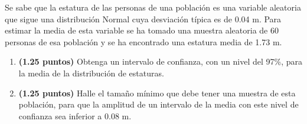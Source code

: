 
Se sabe que la estatura de las personas de una población es una variable aleatoria que sigue una distribución Normal cuya desviación típica es de 0.04 m. Para estimar la media de esta variable se ha tomado una muestra aleatoria de 60 personas de esa población y se ha encontrado una estatura media de 1.73 m.
\begin{enumerate}[label=\alph*)]
\item \textbf{(1.25 puntos)} Obtenga un intervalo de confianza, con un nivel del 97\%, para la media de la distribución de estaturas.
\item \textbf{(1.25 puntos)} Halle el tamaño mínimo que debe tener una muestra de esta población, para que la amplitud de un intervalo de la media con este nivel de confianza sea inferior a 0.08 m.
\end{enumerate}
